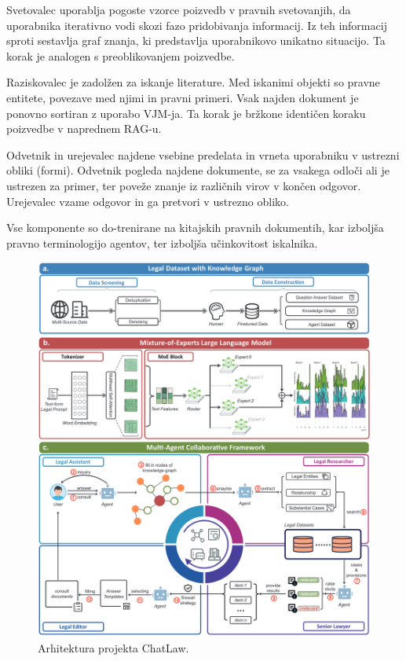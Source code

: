 \documentclass[a4paper,12pt,openright]{book}
\begin{document}
Svetovalec uporablja pogoste vzorce poizvedb v pravnih svetovanjih, da uporabnika iterativno vodi skozi fazo pridobivanja informacij. Iz teh informacij sproti sestavlja graf znanja, ki predstavlja uporabnikovo unikatno situacijo. Ta korak je analogen s preoblikovanjem poizvedbe.

Raziskovalec je zadolžen za iskanje literature. Med iskanimi objekti so pravne entitete, povezave med njimi in pravni primeri. Vsak najden dokument je ponovno sortiran z uporabo VJM-ja. Ta korak je bržkone identičen koraku poizvedbe v naprednem RAG-u.

Odvetnik in urejevalec najdene vsebine predelata in vrneta uporabniku v ustrezni obliki (formi). Odvetnik pogleda najdene dokumente, se za vsakega odloči ali je ustrezen za primer, ter poveže znanje iz različnih virov v končen odgovor. Urejevalec vzame odgovor in ga pretvori v ustrezno obliko.

Vse komponente so do-trenirane na kitajskih pravnih dokumentih, kar izboljša pravno terminologijo agentov, ter izboljša učinkovitost iskalnika.

\begin{figure}[htbp]
    \centering
    \includegraphics[width=\textwidth]{chatlaw.png}
    \caption{Arhitektura projekta ChatLaw.}
    \label{chatlaw}
\end{figure}
\end{document}
